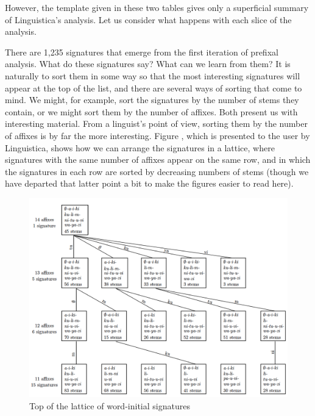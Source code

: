 \documentclass[output=paper,colorlinks,citecolor=brown]{langscibook}
\begin{document}
 
However, the template given in these two tables gives only a superficial summary of Linguistica's analysis. Let us consider what happens with each slice of the analysis.

 
There are 1,235 signatures that emerge from the first iteration of prefixal analysis. What do these signatures say? What can we learn from them? It is naturally to sort them in some way so that the most interesting signatures will appear at the top of the list, and there are several ways of sorting that come to mind. We might, for example, sort the signatures by the number of stems they contain, or we might sort them by the number of affixes. Both present us with interesting material. From a linguist's point of view, sorting them by the number of affixes is by far the more interesting. Figure , which is presented to the user by Linguistica, shows how we can arrange the signatures in a lattice, where signatures with the same number of affixes appear on the same row, and in which the signatures in each row are sorted by decreasing numbers of stems (though we have departed that latter point a bit to make the figures easier to read here). 
 
\begin{figure}
\includegraphics[scale=0.7]{figures/top_of_lattice.png}
\caption{Top of the lattice of word-initial signatures}
\label{lattice}
\end{figure}

\end{document}
